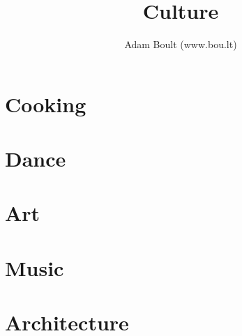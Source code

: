 \documentclass[oneside]{book}
\begin{document}
\author{Adam Boult (www.bou.lt)}
\title{Culture}
\maketitle

\setcounter{tocdepth}{0}
\tableofcontents



\part{Cooking}








\part{Dance}

\part{Art}

\part{Music}

\part{Architecture}
\end{document}
